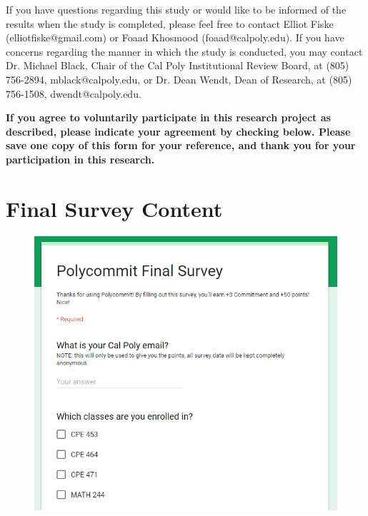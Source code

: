 If you have questions regarding this study or would like to be informed of the results when the study is completed, please feel free to contact Elliot Fiske (elliotfiske@gmail.com) or Foaad Khosmood (foaad@calpoly.edu).  If you have concerns regarding the manner in which the study is conducted, you may contact Dr. Michael Black, Chair of the Cal Poly Institutional Review Board, at (805) 756-2894, mblack@calpoly.edu, or Dr. Dean Wendt, Dean of Research, at (805) 756-1508, dwendt@calpoly.edu.

\textbf{If you agree to voluntarily participate in this research project as described, please indicate your agreement by checking below. Please save one copy of this form for your reference, and thank you for your participation in this research.}

\chapter{Final Survey Content}
\label{appendix:final_survey}

\begin{figure}[h!]
	\includegraphics[width=1.0\linewidth]{figures/survey1}
	\label{fig:survey1}
\end{figure}

